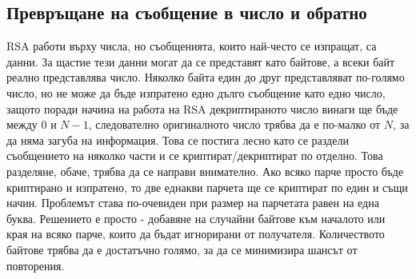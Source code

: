   \subsection{Превръщане на съобщение в число и обратно} \label{paddingscheme}
  RSA работи върху числа, но съобщенията, които най-често се изпращат, са данни. За щастие тези данни могат да се представят като байтове, а всеки байт реално представлява число. Няколко байта един до друг представляват по-голямо число, но не може да бъде изпратено едно дълго съобщение като едно число, защото поради начина на работа на RSA декриптираното число винаги ще бъде между $0$ и $N-1$, следователно оригиналното число трябва да е по-малко от $N$, за да няма загуба на информация. Това се постига лесно като се раздели съобщението на няколко части и се криптират/декриптират по отделно. Това разделяне, обаче, трябва да се направи внимателно. Ако всяко парче просто бъде криптирано и изпратено, то две еднакви парчета ще се криптират по един и същи начин. Проблемът става по-очевиден при размер на парчетата равен на една буква. Решението е просто - добавяне на случайни байтове към началото или края на всяко парче, които да бъдат игнорирани от получателя. Количеството байтове трябва да е достатъчно голямо, за да се минимизира шансът от повторения.

